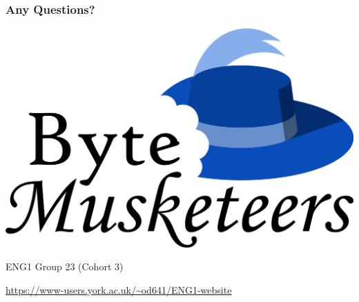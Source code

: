 \documentclass{beamer}
\numberwithin{figure}{section}
\newcommand\shortauthor{ENG1 Group 23 (Cohort 3)}
\newcommand\userurl[1]{\begingroup\color{blue}\url{#1}\endgroup}
\begin{document}
\begin{frame}
    \frametitle{Any Questions?}

    \begin{center}
        \includegraphics[width=.5\textwidth]{../logo}
        \vfill
        \parbox{\textwidth}{%
            \centering\addtolength\parskip{1ex}%
            \shortauthor\par%
            \userurl{https://www-users.york.ac.uk/~od641/ENG1-website}%
        }
    \end{center}
\end{frame}
\end{document}
